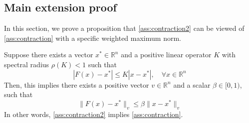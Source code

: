 \subsection{Main extension proof}
In this section, we prove a proposition that \autoref{ass:contraction2} can be viewed of \autoref{ass:contraction} with a specific weighted maximum norm.
\begin{proposition}\label{prop: extension} 
Suppose there exists a vector $x^*\in\mathbb{R}^n$ and a positive linear operator $K$ with spectral radius $\rho(K)<1$ such that 
$$
|F(x)-x^*|\le K|x-x^*|,\quad \forall x\in \mathbb{R}^n
$$
Then, this implies there exists a positive vector $v\in\mathbb{R}^n$ and a scalar $\beta\in [0,1)$, such that
$$
\|F(x)-x^*\|_v \le \beta\|x-x^*\|_v
$$
In other words, \autoref{ass:contraction2} implies \autoref{ass:contraction}.
\end{proposition}
